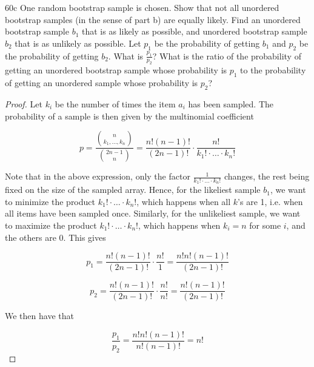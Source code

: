 \begin{exercise}{60c}
    One random bootstrap sample is chosen. Show that not all unordered bootstrap samples (in the sense of part b) are equally likely. Find an unordered bootstrap sample $b_1$ that is as likely as possible, and unordered bootstrap sample $b_2$ that is as unlikely as possible. Let $p_1$ be the probability of getting $b_1$ and $p_2$ be the probability of getting $b_2$. What is $\frac{p_1}{p_2}$? What is the ratio of the probability of getting an unordered bootstrap sample whose probability is $p_1$ to the probability of getting an unordered sample whose probability is $p_2$?
\end{exercise}

\begin{proof}
    Let $k_i$ be the number of times the item $a_i$ has been sampled. The probability of a sample is then given by the multinomial coefficient

    $$p = \frac{{n \choose {k_1, \dots, k_n}}}{{2n-1 \choose n}} = \frac{n!(n-1)!}{(2n-1)!}\cdot\frac{n!}{k_1!\cdot \dots \cdot k_n!}$$

    Note that in the above expression, only the factor $\frac{1}{k_1!\cdot \dots \cdot k_n!}$ changes, the rest being fixed on the size of the sampled array. Hence, for the likeliest sample $b_1$, we want to minimize the product $k_1!\cdot \dots \cdot k_n!$, which happens when all $k$'s are 1, i.e. when all items have been sampled once. Similarly, for the unlikeliest sample, we want to maximize the product $k_1!\cdot \dots \cdot k_n!$, which happens when $k_i=n$ for some $i$, and the others are 0. This gives

    $$p_1 = \frac{n!(n-1)!}{(2n-1)!}\cdot\frac{n!}{1} = \frac{n!n!(n-1)!}{(2n-1)!}$$

    $$p_2 = \frac{n!(n-1)!}{(2n-1)!}\cdot\frac{n!}{n!} = \frac{n!(n-1)!}{(2n-1)!}$$

    We then have that

    $$\frac{p_1}{p_2} = \frac{n!n!(n-1)!}{n!(n-1)!} = n!$$
\end{proof}

\newpage

